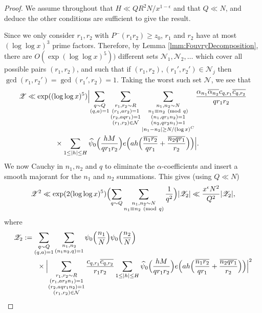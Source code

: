 \documentclass[10pt]{amsart}
\theoremstyle{plain}
\numberwithin{equation}{section}
\newcommand{\Mod}[1]{\ (\mathrm{mod}\ #1)}
\renewcommand{\hat}[1]{\widehat #1}
\begin{document}
\begin{proof}
We assume throughout that $H\ll QR^2N/x^{1-\epsilon}$ and that $Q\ll N$, and deduce the other conditions are sufficient to give the result.

Since we only consider $r_1,r_2$ with $P^-(r_1r_2)\ge z_0$, $r_1$ and $r_2$ have at most $(\log\log{x})^3$ prime factors. Therefore, by Lemma \ref{lmm:FouvryDecomposition}, there are $O(\exp(\log\log{x})^5))$ different sets $\mathcal{N}_1,\mathcal{N}_2,\dots$ which cover all possible pairs $(r_1,r_2)$, and such that if $(r_1,r_2),(r_1',r_2')\in\mathcal{N}_j$ then $\gcd(r_1,r_2')=\gcd(r_1',r_2)=1$. Taking the worst such set $\mathcal{N}$, we see that
 \begin{align*}
\mathscr{Z}&\ll \exp((\log\log{x})^5)\Bigl|\sum_{\substack{q\sim Q\\ (q,a)=1}}\sum_{\substack{r_1,r_2\sim R\\ (r_1,a r_2)=1\\ (r_2,a q r_1)=1\\ (r_1,r_2)\in\mathcal{N}}}\sum_{\substack{n_1,n_2\sim N\\ n_1\equiv n_2\Mod{q}\\ (n_1,q r_ 1 n_2)=1\\ (n_2,q r_2 n_1)=1\\ |n_1-n_2|\ge N/(\log{x})^C}}\frac{\alpha_{n_1}\overline{\alpha_{n_2}}c_{q,r_1}\overline{c_{q,r_2}}}{q r_1 r_2}\\
&\qquad\qquad\times\sum_{1\le |h|\le H}\hat{\psi_0}\Bigl(\frac{h M}{q r_1 r_2}\Bigr)e\Bigl(ah\Bigl(\frac{\overline{n_1 r_2}}{qr_1}+\frac{\overline{n_2 q r_1}}{r_2}\Bigr)\Bigr)\Bigr|.
\end{align*}
We now Cauchy in $n_1,n_2$ and $q$ to eliminate the $\alpha$-coefficients and insert a smooth majorant for the $n_1$ and $n_2$ summations. This gives (using $Q\ll N$)
\[
\mathscr{Z}^2\ll \exp(2(\log\log{x})^5)\Bigl(\sum_{q\sim Q}\sum_{\substack{n_1,n_2\sim N\\ n_1\equiv n_2\Mod{q}}}\frac{1}{q^2}\Bigr)|\mathscr{Z}_2|\ll \frac{x^\epsilon N^2}{Q^2}|\mathscr{Z}_2|,
\]
where
\begin{align*}
\mathscr{Z}_2&:=\sum_{\substack{q\sim Q\\ (q,a)=1}}\sum_{\substack{n_1,n_2\\ (n_1n_2,q)=1}}\psi_0\Bigl(\frac{n_1}{N}\Bigr)\psi_0\Bigl(\frac{n_2}{N}\Bigr)\\
&\qquad \times\Bigl|\sum_{\substack{r_1,r_2\sim R\\ (r_1,a r_2 n_1)=1\\ (r_2,a q r_1 n_2)=1\\ (r_1,r_2)\in\mathcal{N}}}\frac{c_{q,r_1}\overline{c_{q,r_2}}}{r_1 r_2}\sum_{1\le |h|\le H}\hat{\psi_0}\Bigl(\frac{h M}{q r_1 r_2}\Bigr)e\Bigl(ah\Bigl(\frac{\overline{n_1 r_2}}{q r_1}+\frac{\overline{ n_2q r_1}}{r_2}\Bigr)\Bigr)\Bigr|^2\\

\end{align*}
\end{proof}
\end{document}

